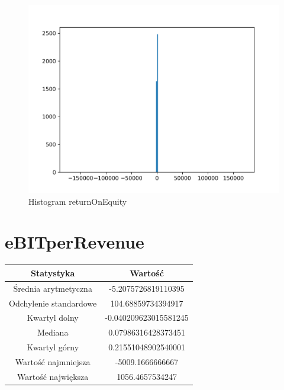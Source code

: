 \documentclass{article}
\begin{document}
\begin{figure}[h!]
    \includegraphics[width=\linewidth]{variables/returnOnEquity.png}
    \caption{Histogram returnOnEquity }
\end{figure}\section{ eBITperRevenue }

\begin{center}
    \begin{tabular}{|c | c|} 
    \hline
    Statystyka & Wartość \\
    \hline\hline
    Średnia arytmetyczna & -5.2075726819110395 \\ 
    \hline
    Odchylenie standardowe & 104.68859734394917 \\
    \hline
    Kwartyl dolny & -0.040209623015581245 \\
    \hline
    Mediana & 0.07986316428373451 \\
    \hline
    Kwartyl górny & 0.21551048902540001 \\
    \hline
    Wartość najmniejsza & -5009.1666666667 \\
    \hline
    Wartość największa & 1056.4657534247 \\
    \hline
   \end{tabular}
\end{center}
\end{document}
